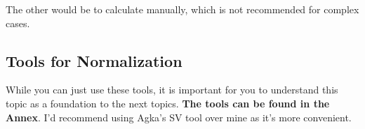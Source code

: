 The other would be to calculate manually, which is not recommended for complex cases.

\subsection{Tools for Normalization}
While you can just use these tools, it is important for you to understand this topic as a foundation to the next topics. \textbf{The tools can be found in the Annex}.
I'd recommend using Agka's SV tool over mine as it's more convenient.


